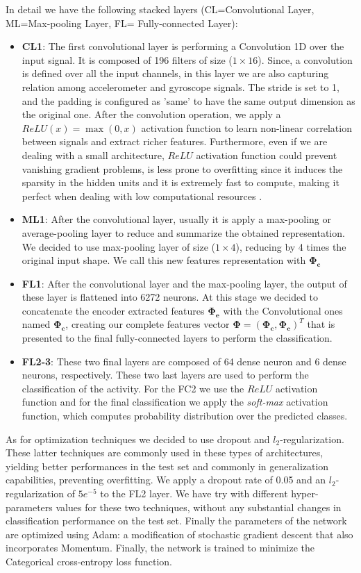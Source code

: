 In detail we have the following stacked layers (CL=Convolutional Layer, ML=Max-pooling Layer, FL= Fully-connected Layer):
\begin{itemize}
	\item \textbf{CL1}: The first convolutional layer is performing a Convolution 1D over the input signal. It is composed of 196 filters of size ($1\times16$). Since, a convolution is defined over all the input channels, in this layer we are also capturing relation among accelerometer and gyroscope signals. The stride is set to 1, and the padding is configured as 'same' to have the same output dimension as the original one. After the convolution operation, we apply a $ReLU(x)=\max(0,x)$ activation function to learn non-linear correlation between signals and extract richer features. Furthermore, even if we are dealing with a small architecture, $ReLU$ activation function could prevent vanishing gradient problems, is less prone to overfitting since it induces the sparsity in the hidden units and it is extremely fast to compute, making it perfect when dealing with low computational resources \cite{ignatov2018real}.
	\item \textbf{ML1}: After the convolutional layer, usually it is apply a max-pooling or average-pooling layer to reduce and summarize the obtained representation. We decided to use max-pooling layer of size ($1\times4$), reducing by 4 times the original input shape. We call this new features representation with $ \boldsymbol{\Phi_{\text{c}} }$
	\item \textbf{FL1}: After the convolutional layer and the max-pooling layer, the output of these layer is flattened into 6272 neurons. At this stage we decided to concatenate the encoder extracted features $ \boldsymbol{\Phi_{\text{e}}} $ with the Convolutional ones named $\boldsymbol{\Phi_{\text{c}}}$, creating our complete features vector $\boldsymbol{\Phi} = (\boldsymbol{\Phi_{\text{c}}}, \boldsymbol{\Phi_{\text{e}}})^T$ that is presented to the final fully-connected layers to perform the classification.
	\item \textbf{FL2-3}: These two final layers are composed of 64 dense neuron and 6 dense neurons, respectively. These two last layers are used to perform the classification of the activity. For the FC2 we use the $ReLU$ activation function and for the final classification we apply the \textit{soft-max} activation function, which computes probability distribution over the predicted classes.
\end{itemize}

As for optimization techniques we decided to use dropout and $l_2$-regularization. These latter techniques are commonly used in these types of architectures, yielding better performances in the test set and commonly in generalization capabilities, preventing overfitting. We apply a dropout rate of 0.05 and an $l_2$-regularization of $5e^{-5}$ to the FL2 layer. We have try with different hyper-parameters values for these two techniques, without any substantial changes in classification performance on the test set. Finally the parameters of the network are optimized using Adam: a modification of stochastic gradient descent that also incorporates Momentum. Finally, the network is trained to minimize the Categorical cross-entropy loss function.
